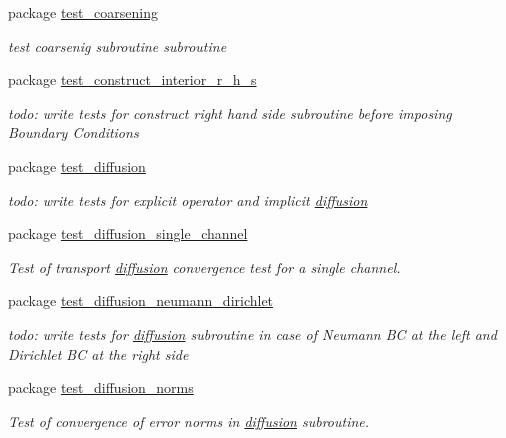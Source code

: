 \begin{CompactItemize}
\item 
package \hyperlink{a00080}{test\_\-coarsening}
\begin{CompactList}\small\item\em test coarsenig subroutine subroutine \item\end{CompactList}

\item 
package \hyperlink{a00081}{test\_\-construct\_\-interior\_\-r\_\-h\_\-s}
\begin{CompactList}\small\item\em todo: write tests for construct right hand side subroutine before imposing Boundary Conditions \item\end{CompactList}

\item 
package \hyperlink{a00083}{test\_\-diffusion}
\begin{CompactList}\small\item\em todo: write tests for explicit operator and implicit \hyperlink{a00058}{diffusion} \item\end{CompactList}

\item 
package \hyperlink{a00086}{test\_\-diffusion\_\-single\_\-channel}
\begin{CompactList}\small\item\em Test of transport \hyperlink{a00058}{diffusion} convergence test for a single channel. \item\end{CompactList}

\item 
package \hyperlink{a00084}{test\_\-diffusion\_\-neumann\_\-dirichlet}
\begin{CompactList}\small\item\em todo: write tests for \hyperlink{a00058}{diffusion} subroutine in case of Neumann BC at the left and Dirichlet BC at the right side \item\end{CompactList}

\item 
package \hyperlink{a00085}{test\_\-diffusion\_\-norms}
\begin{CompactList}\small\item\em Test of convergence of error norms in \hyperlink{a00058}{diffusion} subroutine. \item\end{CompactList}


\end{CompactItemize}
